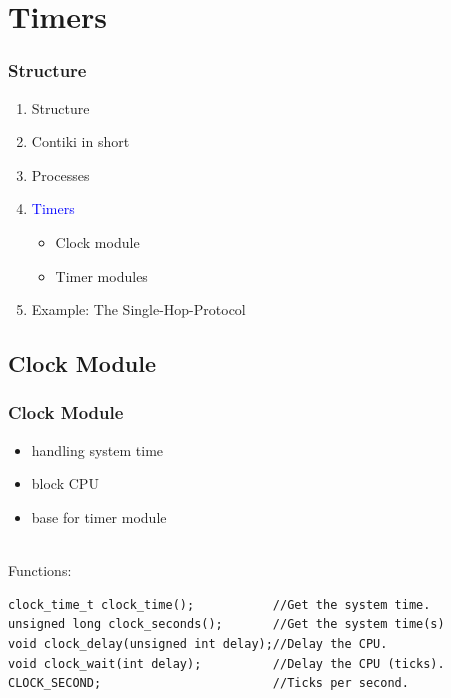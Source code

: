\documentclass{beamer}
\begin{document}
\section{Timers}
\begin{frame}
\frametitle{Structure}
\begin{enumerate}
\item Structure
\item Contiki in short
\item Processes
\item \textcolor{blue}{Timers}
\begin{itemize}
\item Clock module
\item Timer modules
\end{itemize}
\item Example: The Single-Hop-Protocol
\end{enumerate}
\end{frame}

\subsection*{Clock Module}
\begin{frame}[fragile]
\frametitle{Clock Module}
\begin{itemize}
\item handling system time
\item block CPU
\item base for timer module
\end{itemize}
\ \\
Functions:
\begin{lstlisting}[frame=single, basicstyle=\scriptsize]
clock_time_t clock_time();           //Get the system time. 
unsigned long clock_seconds();       //Get the system time(s) 
void clock_delay(unsigned int delay);//Delay the CPU. 
void clock_wait(int delay);          //Delay the CPU (ticks). 
CLOCK_SECOND;                        //Ticks per second.
\end{lstlisting}
\end{frame}
\end{document}
